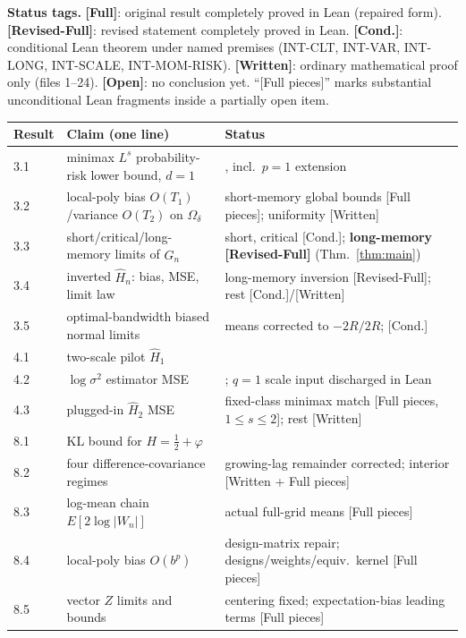 \documentclass[11pt]{article}
\theoremstyle{definition}
\theoremstyle{remark}
\begin{document}
\smallskip\noindent\textbf{Status tags.} \textbf{[Full]}: original result
completely proved in Lean (repaired form). \textbf{[Revised-Full]}: revised
statement completely proved in Lean. \textbf{[Cond.]}: conditional Lean theorem
under named premises (INT-CLT, INT-VAR, INT-LONG, INT-SCALE, INT-MOM-RISK).
\textbf{[Written]}: ordinary mathematical proof only (files 1--24).
\textbf{[Open]}: no conclusion yet. ``[Full pieces]'' marks substantial
unconditional Lean fragments inside a partially open item.

\begin{table}[h]\centering\footnotesize
\begin{tabularx}{\textwidth}{@{}p{}p{}>{\raggedright\arraybackslash}X@{}}
\toprule
Result & Claim (one line) & Status \\
\midrule
3.1 & minimax $L^s$ probability-risk lower bound, $d=1$ & [Full], incl.\ $p=1$ extension \\
3.2 & local-poly bias $O(T_1)$/variance $O(T_2)$ on $\Omega_\delta$ & short-memory global bounds [Full pieces]; uniformity [Written] \\
3.3 & short/critical/long-memory limits of $\widehat G_n$ & short, critical [Cond.]; \textbf{long-memory [Revised-Full]} (Thm.~\ref{thm:main}) \\
3.4 & inverted $\widehat H_n$: bias, MSE, limit law & long-memory inversion [Revised-Full]; rest [Cond.]/[Written] \\
3.5 & optimal-bandwidth biased normal limits & means corrected to $-2R/2R$; [Cond.] \\
4.1 & two-scale pilot $\widehat H_1$ & [Cond.] \\
4.2 & $\log\sigma^2$ estimator MSE & [Written]; $q=1$ scale input discharged in Lean \\
4.3 & plugged-in $\widehat H_2$ MSE & fixed-class minimax match [Full pieces, $1{\le}s{\le}2$]; rest [Written] \\
8.1 & KL bound for $H=\tfrac12+\varphi$ & [Full] \\
8.2 & four difference-covariance regimes & growing-lag remainder corrected; interior [Written + Full pieces] \\
8.3 & log-mean chain $E[2\log|W_n|]$ & actual full-grid means [Full pieces] \\
8.4 & local-poly bias $O(b^p)$ & design-matrix repair; designs/weights/equiv.\ kernel [Full pieces] \\
8.5 & vector $Z$ limits and bounds & centering fixed; expectation-bias leading terms [Full pieces] \\
\bottomrule
\end{tabularx}
\end{table}
\end{document}

